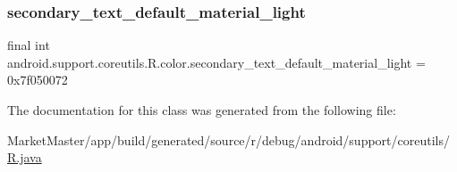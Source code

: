 \subsubsection{\texorpdfstring{secondary\+\_\+text\+\_\+default\+\_\+material\+\_\+light}{secondary\_text\_default\_material\_light}}
{\footnotesize\ttfamily final int android.\+support.\+coreutils.\+R.\+color.\+secondary\+\_\+text\+\_\+default\+\_\+material\+\_\+light = 0x7f050072\hspace{0.3cm}{\ttfamily [static]}}



The documentation for this class was generated from the following file\+:\begin{DoxyCompactItemize}
\item 
Market\+Master/app/build/generated/source/r/debug/android/support/coreutils/\mbox{\hyperlink{debug_2android_2support_2coreutils_2R_8java}{R.\+java}}\end{DoxyCompactItemize}

